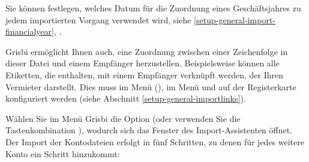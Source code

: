 Sie können festlegen, welches Datum für die Zuordnung eines Geschäftsjahres zu jedem importierten Vorgang verwendet wird, siehe \vref{setup-general-import-financialyear}, .

Grisbi ermöglicht Ihnen auch, eine Zuordnung zwischen einer Zeichenfolge in dieser Datei und einem Empfänger herzustellen. Beispielsweise können alle Etiketten, die  enthalten, mit einem Empfänger verknüpft werden, der Ihren Vermieter darstellt. Dies muss im Menü  (), im Menü  und auf der Registerkarte  konfiguriert werden (siehe Abschnitt \vref{setup-general-importlinks}).


Wählen Sie im Menü Grisbi  die Option  (oder verwenden Sie die Tastenkombination ), wodurch sich das Fenster des Import-Assistenten öffnet. Der Import der Kontodateien erfolgt in fünf Schritten, zu denen für jedes weitere Konto ein Schritt hinzukommt:

